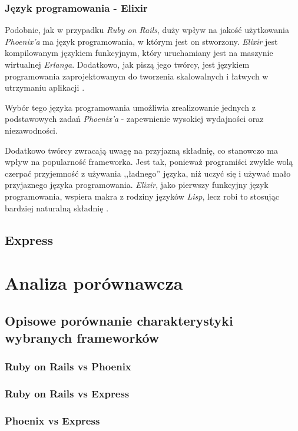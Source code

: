 \documentclass[mgr,oneside]{mgr}
\begin{document}
\subsection{Język programowania - Elixir} %
\label{phoenix:elixir}
Podobnie, jak w przypadku \textit{Ruby on Rails}, duży wpływ na jakość użytkowania \textit{Phoenix'a} ma język programowania, w którym jest on stworzony. \textit{Elixir} jest kompilowanym językiem funkcyjnym, który uruchamiany jest na maszynie wirtualnej \textit{Erlanga}. Dodatkowo, jak piszą jego twórcy, jest językiem programowania zaprojektowanym do tworzenia skalowalnych i łatwych w utrzymaniu aplikacji \cite{elixir}.

Wybór tego języka programowania umożliwia zrealizowanie jednych z podstawowych zadań \textit{Phoenix'a} - zapewnienie wysokiej wydajności oraz niezawodności.

Dodatkowo twórcy zwracają uwagę na przyjazną składnię, co stanowczo ma wpływ na popularność frameworka. Jest tak, ponieważ programiści zwykle wolą czerpać przyjemność z używania ,,ładnego'' języka, niż uczyć się i używać mało przyjaznego języka programowania. \textit{Elixir}, jako pierwszy funkcyjny język programowania, wspiera makra z rodziny języków \textit{Lisp}, lecz robi to stosując bardziej naturalną składnię \cite{phoenix_doctrine}.



\section{Express}

\chapter{Analiza porównawcza}
\section{Opisowe porównanie charakterystyki wybranych frameworków}
\subsection{Ruby on Rails vs Phoenix}
\subsection{Ruby on Rails vs Express}
\subsection{Phoenix vs Express}
\end{document}
